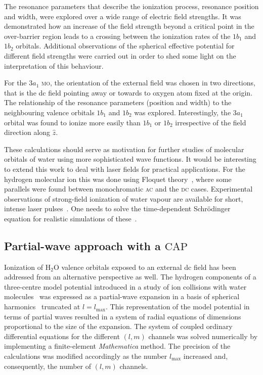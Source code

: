 The resonance parameters that describe the ionization process,
resonance position and width, were explored over a wide range of
electric field strengths. It was demonstrated how an increase of the
field strength beyond a critical point in the over-barrier region
leads to a crossing between the ionization rates of the $1b_{1}$ and
$1b_{2}$ orbitals. Additional observations of the spherical effective
potential for different field strengths were carried out in order to
shed some light on the interpretation of this behaviour.

For the $3a_{1}$ \textsc{mo}, the orientation of the external field
was chosen in two directions, that is the dc field pointing away or
towards to oxygen atom fixed at the origin. The relationship of the
resonance parameters (position and width) to the neighbouring valence
orbitals $1b_{1}$ and $1b_{2}$ was explored. Interestingly, the
$3a_{1}$ orbital was found to ionize more easily than $1b_{1}$ or
$1b_{2}$ irrespective of the field direction along $\hat{z}$.

These calculations should serve as motivation for further studies of
molecular orbitals of water using more sophisticated wave
functions. It would be interesting to extend this work to deal with
laser fields for practical applications. For the hydrogen molecular
ion this was done using Floquet theory~\cite{Tsog_H2mol_ac_2013},
where some parallels were found between monochromatic \textsc{ac} and
the \textsc{dc} cases. Experimental observations of strong-field
ionization of water vapour are available for short, intense laser
pulses~\cite{exp_h2o_laser_2008,exp_h2o_laser_2014}. One needs to
solve the time-dependent Schr\"{o}dinger equation for realistic
simulations of these~\cite{Farrell_2011,Falge_2010}.


\subsection*{Partial-wave approach with a $\mathrm{CAP}$}

Ionization of H$_{2}$O valence orbitals exposed to an external dc
field has been addressed from an alternative perspective as well. The
hydrogen components of a three-centre model potential introduced in a
study of ion collisions with water
molecules~\cite{illescas_modelV_2011} was expressed as a partial-wave
expansion in a basis of spherical harmonics~\cite{marko_partialwave}
truncated at $l = l_{\mathrm{max}}$. This representation of the model
potential in terms of partial waves resulted in a system of radial
equations of dimensions proportional to the size of the expansion. The
system of coupled ordinary differential equations for the different
$(l,m)$ channels was solved numerically by implementing a
finite-element \emph{Mathematica} method. The precision of the
calculations was modified accordingly as the number $l_{\mathrm{max}}$
increased and, consequently, the number of $(l,m)$ channels.

